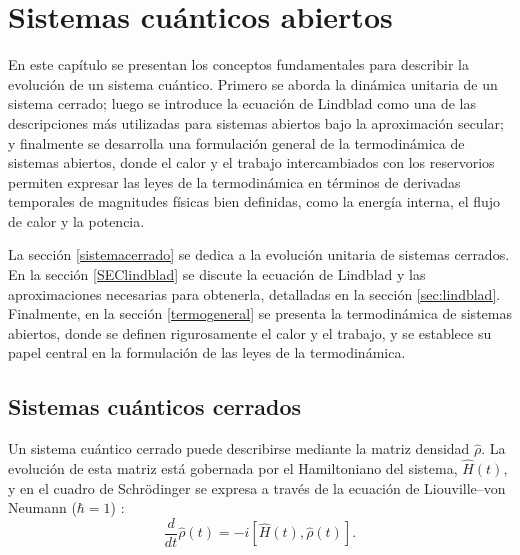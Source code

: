 


\chapter{Sistemas cuánticos abiertos}

En este capítulo se presentan los conceptos fundamentales para describir la evolución de un sistema cuántico. 
Primero se aborda la dinámica unitaria de un sistema cerrado; luego se introduce la ecuación de Lindblad como una de las descripciones más utilizadas para sistemas abiertos bajo la aproximación secular; y finalmente se desarrolla una formulación general de la termodinámica de sistemas abiertos, donde el calor y el trabajo intercambiados con los reservorios permiten expresar las leyes de la termodinámica en términos de derivadas temporales de magnitudes físicas bien definidas, como la energía interna, el flujo de calor y la potencia.

La sección \ref{sistemacerrado} se dedica a la evolución unitaria de sistemas cerrados. 
En la sección \ref{SEClindblad} se discute la ecuación de Lindblad y las aproximaciones necesarias para obtenerla, detalladas en la sección \ref{sec:lindblad}. 
Finalmente, en la sección \ref{termogeneral} se presenta la termodinámica de sistemas abiertos, donde se definen rigurosamente el calor y el trabajo, y se establece su papel central en la formulación de las leyes de la termodinámica.

\section{Sistemas cuánticos cerrados}
Un sistema cuántico cerrado puede describirse mediante la matriz densidad $\hat{\rho}$. La evolución de esta matriz está gobernada por el Hamiltoniano del sistema, $\hat{H}(t)$, y en el cuadro de Schrödinger se expresa a través de la ecuación de Liouville--von Neumann ($\hbar = 1$) \cite{breuer2002theory}:
\label{sistemacerrado}
\begin{equation*}
    \frac{d}{dt}\hat{\rho}(t) = -i[\hat{H}(t),\hat{\rho}(t)].
\end{equation*}

